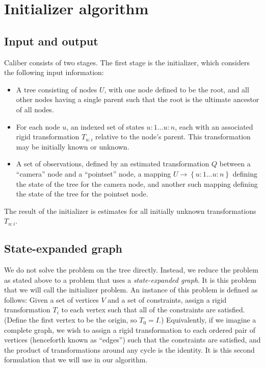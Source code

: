 \section{Initializer algorithm}

\subsection{Input and output}

Caliber consists of two stages. The first stage is the initializer, which considers the following 
input information:

\begin{itemize}
	\item A tree consisting of nodes $U$, with one node defined to be the root, and all other nodes
		having a single parent such that the root is the ultimate ancestor of all nodes.
	\item For each node $u$, an indexed set of states $u \colon 1 \ldots u \colon n$, 
		each with an associated
		rigid transformation $T_{u \colon i}$ relative to the node's parent. 
		This transformation may be initially known or unknown.
	\item A set of observations, defined by an estimated transformation $Q$ between a ``camera'' node
		and a ``pointset'' node, 
		a mapping $U \rightarrow \left\{u \colon 1 \ldots u \colon n \right\}$ defining 
		the state of the tree for the camera node, and another such mapping defining the state
		of the tree for the pointset node.
\end{itemize}

The result of the initializer is estimates for all initially unknown transformations $T_{u \colon i}$.

\subsection{State-expanded graph}

We do not solve the problem on the tree directly. Instead, we reduce the problem as stated
above to a problem that uses a \textit{state-expanded graph}. It is this problem that we will
call the initializer problem. An instance of this problem is defined as follows:
Given a set of vertices $V$ and a set of constraints, assign a rigid transformation $T_i$ to each vertex
such that all of the constraints are satisfied. (Define the first vertex to be the origin, so $T_0 = I$.)
Equivalently, if we imagine a complete graph, we wish to 
assign a rigid transformation to each ordered pair of vertices
(henceforth known as ``edges'') such that the constraints are satisfied, 
and the product of transformations around any cycle is the identity. 
It is this second formulation that we will use in our algorithm.

